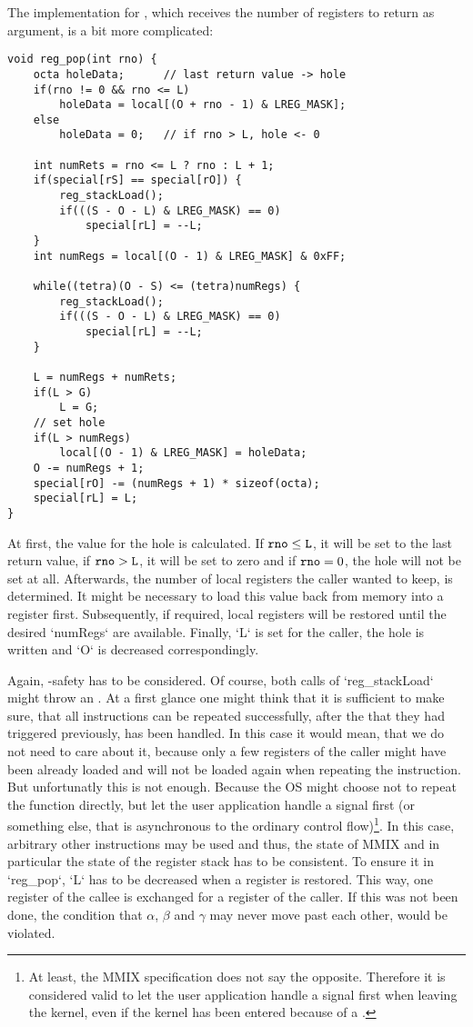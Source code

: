 The implementation for , which receives the number of registers to return as argument, is a bit more complicated:
\begin{lstlisting}[language=GIMMIXC,caption=Implementation of {\tt reg\_pop}]
void reg_pop(int rno) {
	octa holeData;		// last return value -> hole
	if(rno != 0 && rno <= L)
		holeData = local[(O + rno - 1) & LREG_MASK];
	else
		holeData = 0;	// if rno > L, hole <- 0

	int numRets = rno <= L ? rno : L + 1;
	if(special[rS] == special[rO]) {
		reg_stackLoad();
		if(((S - O - L) & LREG_MASK) == 0)
			special[rL] = --L;
	}
	int numRegs = local[(O - 1) & LREG_MASK] & 0xFF;
	
	while((tetra)(O - S) <= (tetra)numRegs) {
		reg_stackLoad();
		if(((S - O - L) & LREG_MASK) == 0)
			special[rL] = --L;
	}

	L = numRegs + numRets;
	if(L > G)
		L = G;
	// set hole
	if(L > numRegs)
		local[(O - 1) & LREG_MASK] = holeData;
	O -= numRegs + 1;
	special[rO] -= (numRegs + 1) * sizeof(octa);
	special[rL] = L;
}
\end{lstlisting}
At first, the value for the hole is calculated. If ${\tt rno} \le {\tt L}$, it will be set to the last return value, if ${\tt rno} > {\tt L}$, it will be set to zero and if ${\tt rno} = 0$, the hole will not be set at all. Afterwards, the number of local registers the caller wanted to keep, is determined. It might be necessary to load this value back from memory into a register first. Subsequently, if required, local registers will be restored until the desired `numRegs` are available. Finally, `L` is set for the caller, the hole is written and `O` is decreased correspondingly.

Again, -safety has to be considered. Of course, both calls of `reg_stackLoad` might throw an . At a first glance one might think that it is sufficient to make sure, that all instructions can be repeated successfully, after the  that they had triggered previously, has been handled. In this case it would mean, that we do not need to care about it, because only a few registers of the caller might have been already loaded and will not be loaded again when repeating the instruction. But unfortunatly this is not enough. Because the OS might choose not to repeat the function directly, but \eg let the user application handle a signal first (or something else, that is asynchronous to the ordinary control flow)\footnote{At least, the MMIX specification does not say the opposite. Therefore it is considered valid to let the user application handle a signal first when leaving the kernel, even if the kernel has been entered because of a .}. In this case, arbitrary other instructions may be used and thus, the state of MMIX and in particular the state of the register stack has to be consistent. To ensure it in `reg_pop`, `L` has to be decreased when a register is restored. This way, one register of the callee is exchanged for a register of the caller. If this was not been done, the condition that $\alpha$, $\beta$ and $\gamma$ may never move past each other, would be violated.

